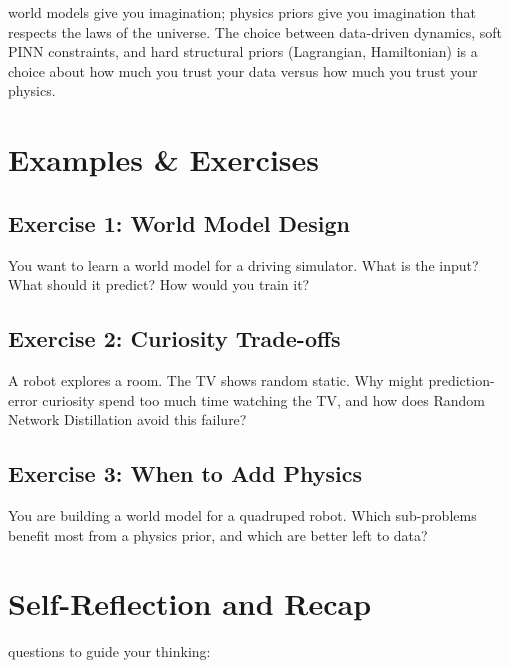  world models give you imagination; physics priors give you imagination that respects the laws of the universe. The choice between data-driven dynamics, soft PINN constraints, and hard structural priors (Lagrangian, Hamiltonian) is a choice about how much you trust your data versus how much you trust your physics.



\newpage
\section{Examples \& Exercises}

\subsection{Exercise 1: World Model Design}

You want to learn a world model for a driving simulator. What is the input? What should it predict? How would you train it?

\subsection{Exercise 2: Curiosity Trade-offs}

A robot explores a room. The TV shows random static. Why might prediction-error curiosity spend too much time watching the TV, and how does Random Network Distillation avoid this failure?

\subsection{Exercise 3: When to Add Physics}

You are building a world model for a quadruped robot. Which sub-problems benefit most from a physics prior, and which are better left to data?


\fi

\section{Self-Reflection and Recap}

 questions to guide your thinking:

